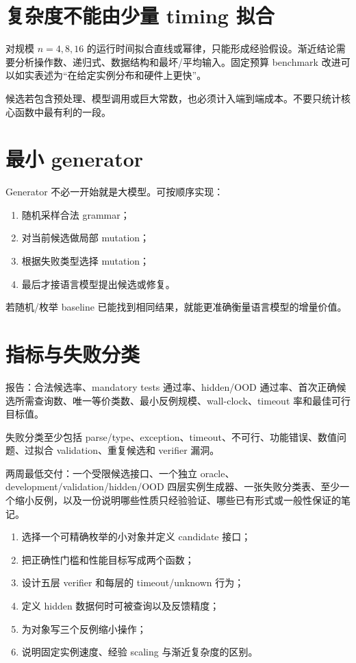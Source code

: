 \section{复杂度不能由少量 timing 拟合}

对规模 $n=4,8,16$ 的运行时间拟合直线或幂律，只能形成经验假设。渐近结论需要分析操作数、递归式、数据结构和最坏/平均输入。固定预算 benchmark 改进可以如实表述为“在给定实例分布和硬件上更快”。

候选若包含预处理、模型调用或巨大常数，也必须计入端到端成本。不要只统计核心函数中最有利的一段。

\section{最小 generator}

Generator 不必一开始就是大模型。可按顺序实现：
\begin{enumerate}
  \item 随机采样合法 grammar；
  \item 对当前候选做局部 mutation；
  \item 根据失败类型选择 mutation；
  \item 最后才接语言模型提出候选或修复。
\end{enumerate}
若随机/枚举 baseline 已能找到相同结果，就能更准确衡量语言模型的增量价值。

\section{指标与失败分类}

报告：合法候选率、mandatory tests 通过率、hidden/OOD 通过率、首次正确候选所需查询数、唯一等价类数、最小反例规模、wall-clock、timeout 率和最佳可行目标值。

失败分类至少包括 parse/type、exception、timeout、不可行、功能错误、数值问题、过拟合 validation、重复候选和 verifier 漏洞。

\begin{protocolbox}
两周最低交付：一个受限候选接口、一个独立 oracle、development/validation/hidden/OOD 四层实例生成器、一张失败分类表、至少一个缩小反例，以及一份说明哪些性质只经验验证、哪些已有形式或一般性保证的笔记。
\end{protocolbox}

\begin{checkpointbox}
\begin{enumerate}
  \item 选择一个可精确枚举的小对象并定义 candidate 接口；
  \item 把正确性门槛和性能目标写成两个函数；
  \item 设计五层 verifier 和每层的 timeout/unknown 行为；
  \item 定义 hidden 数据何时可被查询以及反馈精度；
  \item 为对象写三个反例缩小操作；
  \item 说明固定实例速度、经验 scaling 与渐近复杂度的区别。
\end{enumerate}
\end{checkpointbox}
